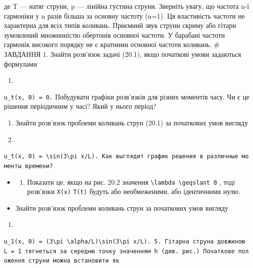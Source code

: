 \documentclass[
  ukrainian,
]{article}
\providecommand{\tightlist}{%
  \setlength{\itemsep}{0pt}\setlength{\parskip}{0pt}}
\begin{document}
де T --- натяг струни, p --- лінійна густина струни. Зверніть увагу, що
частота n-ї гармоніки у n разів більша за основну частоту (n=1). Ця
властивість частоти не характерна для всіх типів коливань. Приємний звук
струни скриму або гітари зумовлений множинністю обертонів основної
частоти. У барабані частоти гармонік високого порядку не є кратними
основної частоти коливань. \# ЗАВДАННЯ 1. Знайти розв'язок задачі
(20.1), якщо початкові умови задаються формулами

\begin{enumerate}
\def\labelenumi{\arabic{enumi}.}
\setcounter{enumi}{9}
\tightlist
\item
\end{enumerate}

\texttt{u\_t(x,\ 0)\ =\ 0.} Побудувати графіки розв'язків для різних
моментів часу. Чи є це рішення періодичним у часі? Який у нього період?

\begin{enumerate}
\def\labelenumi{\arabic{enumi}.}
\setcounter{enumi}{1}
\item
  Знайти розв'язок проблеми коливань струн (20.1) за початкових умов
  вигляду
\item
\end{enumerate}

\texttt{\textquotesingle{}u\_t(x,\ 0)\ =\ \textbackslash{}sin(3\textbackslash{}pi\ x/L).\textquotesingle{}\ Как\ выглядит\ график\ решения\ в\ различные\ моменты\ времени?}

\begin{itemize}
\tightlist
\item
  \begin{enumerate}
  \def\labelenumi{\arabic{enumi}.}
  \setcounter{enumi}{2}
  \tightlist
  \item
    Показати це, якщо на рис. 20.2 значення
    \texttt{\textbackslash{}lambda\ \textbackslash{}geqslant\ 0} , тоді
    розв'язки \texttt{X(x)} \texttt{T(t)} будуть або необмеженими, або
    ідентичними нулю.
  \end{enumerate}
\item
  Знайти розв'язок проблеми коливань струн за початкових умов вигляду
\end{itemize}

\begin{enumerate}
\def\labelenumi{\arabic{enumi}.}
\setcounter{enumi}{11}
\tightlist
\item
\end{enumerate}

\texttt{\textquotesingle{}u\_1(x,\ 0)\ =\ (3\textbackslash{}pi\ \textbackslash{}alpha/L)\textbackslash{}sin(3\textbackslash{}pi\ x/L).\textquotesingle{}\ 5.\ Гітарна\ струна\ довжиною\ L\ =\ 1\ тягнеться\ за\ середню\ точку\ значенням\ h\ (див.\ рис.)\ Початкове\ положення\ струни\ можна\ встановити\ як}
\end{document}
